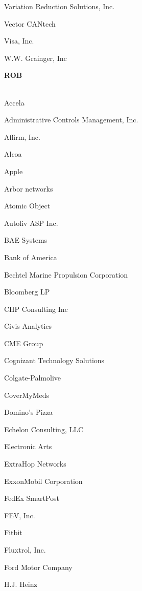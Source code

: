 \documentclass[twoside]{article}
\begin{document}
\begin{center}
\begin{multicols}{5}
\begin{FlushLeft}
\begin{compactitem}
\item Variation Reduction Solutions, Inc.
\item Vector CANtech
\item Visa, Inc.
\item W.W. Grainger, Inc
\end{compactitem}
        \end{FlushLeft}
        \vspace{1em}
        {\fontsize{14}{16}\selectfont \bf ROB}\\
        \vspace{-1em}
        ~\hrulefill~
        \vspace{-.9em}
        \begin{FlushLeft}
        \begin{compactitem}
        \item Accela
\item Administrative Controls Management, Inc.
\item Affirm, Inc.
\item Alcoa
\item Apple
\item Arbor networks
\item Atomic Object
\item Autoliv ASP Inc.
\item BAE Systems
\item Bank of America
\item Bechtel Marine Propulsion Corporation
\item Bloomberg LP
\item CHP Consulting Inc
\item Civis Analytics
\item CME Group
\item Cognizant Technology Solutions
\item Colgate-Palmolive
\item CoverMyMeds
\item Domino's Pizza
\item Echelon Consulting, LLC
\item Electronic Arts
\item ExtraHop Networks
\item ExxonMobil Corporation
\item FedEx SmartPost
\item FEV, Inc.
\item Fitbit
\item Fluxtrol, Inc.
\item Ford Motor Company
\item H.J. Heinz

\end{compactitem}
\end{FlushLeft}
\end{multicols}
\end{center}
\end{document}
